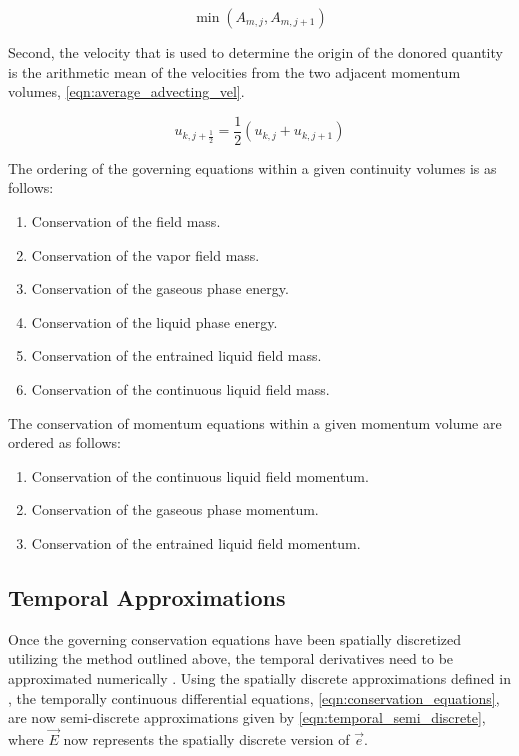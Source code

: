 \begin{equation}
\label{eqn:area_def}
\min\left(A_{m,j}, A_{m,j+1}\right)
\end{equation}

Second, the velocity that is used to determine the origin of the donored quantity is the arithmetic mean of the velocities from the two adjacent momentum volumes, \eqref{eqn:average_advecting_vel}.

\begin{equation}
\label{eqn:average_advecting_vel}
u_{k,j+\frac{1}{2}} = \frac{1}{2}\left(u_{k,j} + u_{k, j+1}\right)
\end{equation}

The ordering of the governing equations within a given continuity volumes is as follows:

\begin{enumerate}
\item{Conservation of the \ncg{} field mass.}
\item{Conservation of the vapor field mass.}
\item{Conservation of the gaseous phase energy.}
\item{Conservation of the liquid phase energy.}
\item{Conservation of the entrained liquid field mass.}
\item{Conservation of the continuous liquid field mass.}
\end{enumerate}

The conservation of momentum equations within a given momentum volume are ordered as follows:

\begin{enumerate}
\item{Conservation of the continuous liquid field momentum.}
\item{Conservation of the gaseous phase momentum.}
\item{Conservation of the entrained liquid field momentum.}
\end{enumerate}

\subsection{Temporal Approximations}
\label{subsect:temporal_approx}

Once the governing conservation equations have been spatially discretized utilizing the method outlined above, the temporal derivatives need to be approximated numerically .
Using the spatially discrete approximations defined in , the temporally continuous differential equations, \eqref{eqn:conservation_equations}, are now semi-discrete approximations given by \eqref{eqn:temporal_semi_discrete}, where $\vec{E}$ now represents the spatially discrete version of $\vec{e}$.

